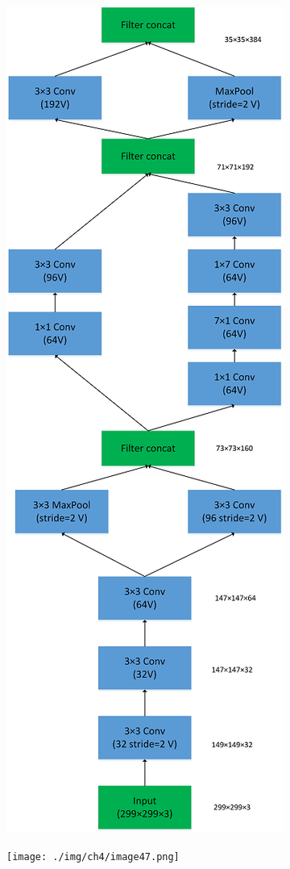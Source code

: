\begin{figure}
\centering
\includegraphics{./img/ch4/image46.png}
\caption{}
\end{figure}

\begin{figure}
\centering
\texttt{[image: ./img/ch4/image47.png]}
\caption{}
\end{figure}

